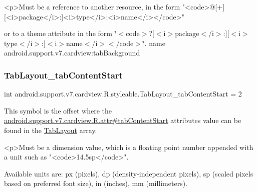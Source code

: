 \begin{DoxyVerb}      <p>Must be a reference to another resource, in the form "<code>@[+][<i>package</i>:]<i>type</i>:<i>name</i></code>"
\end{DoxyVerb}
 or to a theme attribute in the form \char`\"{}$<$code$>$?\mbox{[}$<$i$>$package$<$/i$>$\+:\mbox{]}\mbox{[}$<$i$>$type$<$/i$>$\+:\mbox{]}$<$i$>$name$<$/i$>$$<$/code$>$\char`\"{}.  name android.\+support.\+v7.\+cardview\+:tab\+Background \mbox{\label{classandroid_1_1support_1_1v7_1_1cardview_1_1R_1_1styleable_ad3da5de5c86701f6df05c289f3be2530}} 
\subsubsection{\texorpdfstring{Tab\+Layout\+\_\+tab\+Content\+Start}{TabLayout\_tabContentStart}}
{\footnotesize\ttfamily int android.\+support.\+v7.\+cardview.\+R.\+styleable.\+Tab\+Layout\+\_\+tab\+Content\+Start = 2\hspace{0.3cm}{\ttfamily [static]}}

This symbol is the offset where the \hyperlink{classandroid_1_1support_1_1v7_1_1cardview_1_1R_1_1attr_aabbbb2a5e66b6f302100163d05d7e57f}{android.\+support.\+v7.\+cardview.\+R.\+attr\#tab\+Content\+Start} attribute\textquotesingle{}s value can be found in the \hyperlink{classandroid_1_1support_1_1v7_1_1cardview_1_1R_1_1styleable_afa0dc9366603eaec9e38d99273ba8512}{Tab\+Layout} array.

\begin{DoxyVerb}      <p>Must be a dimension value, which is a floating point number appended with a unit such as "<code>14.5sp</code>".
\end{DoxyVerb}
 Available units are\+: px (pixels), dp (density-\/independent pixels), sp (scaled pixels based on preferred font size), in (inches), mm (millimeters). 

